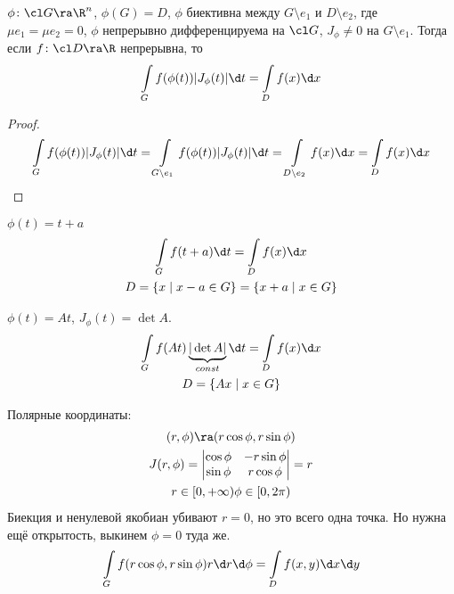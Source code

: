 \begin{conseq}
	$\phi\colon \cl G \ra \R^n$, $\phi(G) = D$, $\phi$ биективна между $G \setminus e_1$ и $D \setminus e_2$, где $\mu e_1 = \mu e_2 = 0$,
	$\phi$ непрерывно дифференцируема на $\cl G$, $J_\phi \ne 0$ на $G \setminus e_1$.
	Тогда если $f\colon \cl D \ra \R$ непрерывна, то
	\[ \int\limits_G f(\phi(t)) |J_\phi(t)| \d t = \int\limits_D f(x) \d x \]
\end{conseq}
\begin{proof}
	\[ \int\limits_G f(\phi(t)) |J_\phi(t)| \d t = \int\limits_{G \setminus e_1} f(\phi(t)) |J_\phi(t)| \d t =
		\int\limits_{D \setminus e_2} f(x) \d x = \int\limits_D f(x) \d x \]
\end{proof}

\begin{exmp}
	$\phi(t) = t + a$
	\begin{gather*}
		\int\limits_G f(t + a) \d t = \int\limits_D f(x) \d x \\
		D = \{x \mid x - a \in G\} = \{x+a \mid x \in G\}
	\end{gather*}
\end{exmp}

\begin{exmp}
	$\phi(t) = At$, $J_\phi(t) = \det A$.
	\begin{gather*}
		\int\limits_G f(At) \underbrace{|\det A|}_{const} \d t = \int\limits_D f(x) \d x \\
		D = \{Ax \mid x \in G\}
	\end{gather*}
\end{exmp}

\begin{exmp}
	Полярные координаты:
	\begin{gather*}
		(r, \phi) \ra (r \cos \phi, r \sin \phi) \\
		J(r, \phi) = \begin{vmatrix} \cos \phi & -r \sin \phi \\ \sin \phi & r \cos \phi \end{vmatrix} = r \\
		r \in [0, +\infty) \phi \in [0, 2\pi)
	\end{gather*}
	Биекция и ненулевой якобиан убивают $r = 0$, но это всего одна точка.
	Но нужна ещё открытость, выкинем $\phi = 0$ туда же.
	\begin{gather*}
		\int\limits_G f(r \cos \phi, r \sin \phi) r \d r \d \phi = \int\limits_D f(x, y) \d x \d y
	\end{gather*}
\end{exmp}

